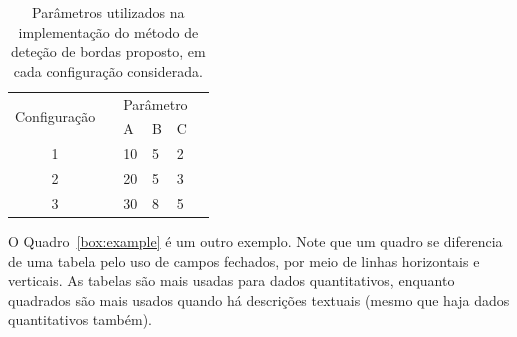 \documentclass[a4paper, 12pt]{ppgeb}
\begin{document}
\begin{table}[h]
\centering
\caption{Parâmetros utilizados na implementação do método de deteção de bordas proposto, em cada configuração considerada.}\label{tab:exemplo}
\begin{tabular}{ccllll}
\cline{1-5}
\multirow{2}{*}{Configuração} && \multicolumn{3}{l}{\hspace*{12pt}Parâmetro}&  \\
&& \hspace{4pt}A\hspace{4pt} & \hspace{4pt}B\hspace{4pt} & \hspace{4pt}C\hspace{4pt} & \\ \cline{1-5}
1                             && \hspace{4pt}10\hspace{4pt}        & \hspace{4pt}5\hspace{4pt}       & \hspace{4pt}2\hspace{4pt}       &  \\
2                             && \hspace{4pt}20\hspace{4pt}        & \hspace{4pt}5\hspace{4pt}       & \hspace{4pt}3\hspace{4pt}       &  \\
3                             && \hspace{4pt}30\hspace{4pt}        & \hspace{4pt}8\hspace{4pt}       & \hspace{4pt}5\hspace{4pt}       &  \\ \cline{1-5}
\end{tabular}
\end{table}

O Quadro~\ref{box:example} é um outro exemplo. Note que um quadro se diferencia de uma tabela pelo uso de campos fechados, por meio de linhas horizontais e verticais. As tabelas são mais usadas para dados quantitativos, enquanto quadrados são mais usados quando há descrições textuais (mesmo que haja dados quantitativos também).
\end{document}
